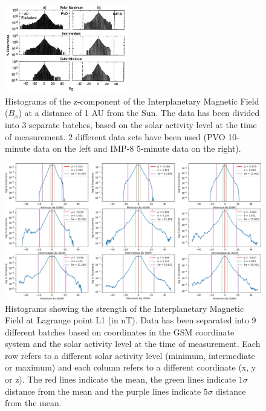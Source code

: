 \documentclass[12pt]{article}
\begin{document}
        \begin{figure}[t!]
            \centering
            \includegraphics[width=0.48\textwidth]{fig_introduction/russellBZ.png}
            \caption{Histograms of the z-component of the Interplanetary Magnetic Field ($B_x$) at a distance of 1 AU from the Sun\cite{2001russell}. The data has been divided into 3 separate batches, based on the solar activity level at the time of measurement. 2 different data sets have been used (PVO 10-minute data on the left and IMP-8 5-minute data on the right).}
            \label{fig:russellBZ}
        \end{figure}
        \begin{figure}[t!]
            \centering
            \includegraphics[width=\textwidth]{fig_introduction/hist_imf_strength.png}
            \caption{Histograms showing the strength of the Interplanetary Magnetic Field at Lagrange point L1 (in nT). Data has been separated into 9 different batches based on coordinates in the GSM coordinate system and the solar activity level at the time of measurement. Each row refers to a different solar activity level (minimum, intermediate or maximum) and each column refers to a different coordinate (x, y or z). The red lines indicate the mean, the green lines indicate $1\sigma$ distance from the mean and the purple lines indicate $5\sigma$ distance from the mean.}
            \label{fig:hist_imf}
        \end{figure}
\end{document}
